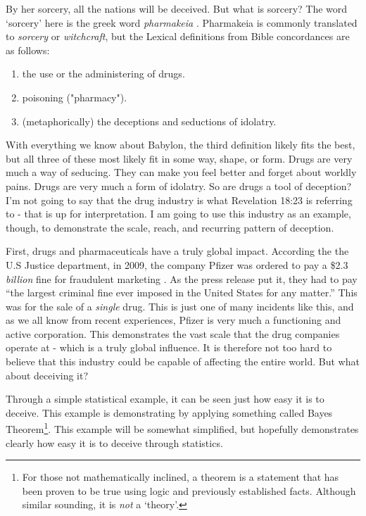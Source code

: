 \documentclass[10pt]{article}
\begin{document}
\begin{multicols}{2}
By her sorcery, all the nations will be deceived. But what is sorcery? The word `sorcery' here is the greek word \textit{pharmakeia} \cite{pharmakeia}. Pharmakeia is commonly translated to \textit{sorcery} or \textit{witchcraft}, but the Lexical definitions from Bible concordances are as follows:
\begin{enumerate}\itemsep0em 
\item the use or the administering of drugs.
\item poisoning ("pharmacy").
\item (metaphorically) the deceptions and seductions of idolatry.
\end{enumerate}
With everything we know about Babylon, the third definition likely fits the best, but all three of these most likely fit in some way, shape, or form. Drugs are very much a way of seducing. They can make you feel better and forget about worldly pains. Drugs are very much a form of idolatry. So are drugs a tool of deception? I'm not going to say that the drug industry is what  Revelation 18:23 is referring to - that is up for interpretation. I am going to use this industry as an example, though, to demonstrate the scale, reach, and recurring pattern of deception.

First, drugs and pharmaceuticals have a truly global impact. According the the U.S Justice department, in 2009, the company Pfizer was ordered to pay a \$2.3 \textit{billion} fine for fraudulent marketing \cite{pfizer_fine}. As the press release put it, they had to pay ``the largest criminal fine ever imposed in the United States for any matter.'' This was for the sale of a \textit{single} drug. This is just one of many incidents like this, and as we all know from recent experiences, Pfizer is very much a functioning and active corporation. This demonstrates the vast scale that the drug companies operate at - which is a truly global influence. It is therefore not too hard to believe that this industry could be capable of affecting the entire world. But what about deceiving it?

Through a simple statistical example, it can be seen just how easy it is to deceive. This example is demonstrating by applying something called Bayes Theorem\footnote{For those not mathematically inclined, a theorem is a statement that has been proven to be true using logic and previously established facts. Although similar sounding, it is \textit{not} a `theory'.}. This example will be somewhat simplified, but hopefully demonstrates clearly how easy it is to deceive through statistics. 


\end{multicols}
\end{document}
